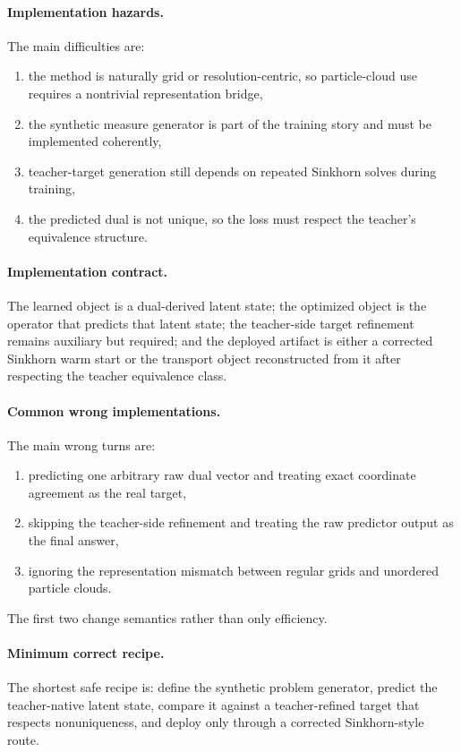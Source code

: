 \documentclass[11pt]{report}
\begin{document}
\paragraph{Implementation hazards.}
The main difficulties are:
\begin{enumerate}[label=(\roman*)]
  \item the method is naturally grid or resolution-centric, so particle-cloud use requires a nontrivial representation bridge,
  \item the synthetic measure generator is part of the training story and must be implemented coherently,
  \item teacher-target generation still depends on repeated Sinkhorn solves during training,
  \item the predicted dual is not unique, so the loss must respect the teacher's equivalence structure.
\end{enumerate}

\paragraph{Implementation contract.}
The learned object is a dual-derived latent state; the optimized object is the operator
that predicts that latent state; the teacher-side target refinement remains auxiliary but
required; and the deployed artifact is either a corrected Sinkhorn warm start or the
transport object reconstructed from it after respecting the teacher equivalence class.

\paragraph{Common wrong implementations.}
The main wrong turns are:
\begin{enumerate}[label=(\roman*)]
  \item predicting one arbitrary raw dual vector and treating exact coordinate agreement as the real target,
  \item skipping the teacher-side refinement and treating the raw predictor output as the final answer,
  \item ignoring the representation mismatch between regular grids and unordered particle clouds.
\end{enumerate}
The first two change semantics rather than only efficiency.

\paragraph{Minimum correct recipe.}
The shortest safe recipe is: define the synthetic problem generator, predict the
teacher-native latent state, compare it against a teacher-refined target that respects
nonuniqueness, and deploy only through a corrected Sinkhorn-style route.
\end{document}
